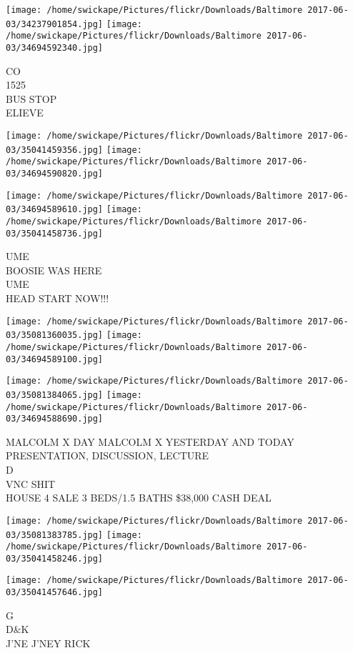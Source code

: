 \documentclass[10pt,letterpaper]{article}
\begin{document}
\texttt{[image: /home/swickape/Pictures/flickr/Downloads/Baltimore 2017-06-03/34237901854.jpg]}
\texttt{[image: /home/swickape/Pictures/flickr/Downloads/Baltimore 2017-06-03/34694592340.jpg]}

CO\\
1525\\
BUS STOP\\
ELIEVE
\pagebreak

\texttt{[image: /home/swickape/Pictures/flickr/Downloads/Baltimore 2017-06-03/35041459356.jpg]}
\texttt{[image: /home/swickape/Pictures/flickr/Downloads/Baltimore 2017-06-03/34694590820.jpg]}

\texttt{[image: /home/swickape/Pictures/flickr/Downloads/Baltimore 2017-06-03/34694589610.jpg]}
\texttt{[image: /home/swickape/Pictures/flickr/Downloads/Baltimore 2017-06-03/35041458736.jpg]}

UME\\
BOOSIE WAS HERE\\
UME\\
HEAD START NOW!!!
\pagebreak

\texttt{[image: /home/swickape/Pictures/flickr/Downloads/Baltimore 2017-06-03/35081360035.jpg]}
\texttt{[image: /home/swickape/Pictures/flickr/Downloads/Baltimore 2017-06-03/34694589100.jpg]}

\texttt{[image: /home/swickape/Pictures/flickr/Downloads/Baltimore 2017-06-03/35081384065.jpg]}
\texttt{[image: /home/swickape/Pictures/flickr/Downloads/Baltimore 2017-06-03/34694588690.jpg]}

MALCOLM X DAY MALCOLM X YESTERDAY AND TODAY PRESENTATION, DISCUSSION, LECTURE\\
D\\
VNC SHIT\\
HOUSE 4 SALE 3 BEDS/1.5 BATHS \$38,000 CASH DEAL
\pagebreak

\texttt{[image: /home/swickape/Pictures/flickr/Downloads/Baltimore 2017-06-03/35081383785.jpg]}
\texttt{[image: /home/swickape/Pictures/flickr/Downloads/Baltimore 2017-06-03/35041458246.jpg]}

\vspace{0.25in}
\texttt{[image: /home/swickape/Pictures/flickr/Downloads/Baltimore 2017-06-03/35041457646.jpg]}

G\\
D\&K\\
J'NE J'NEY RICK
\pagebreak
\end{document}
